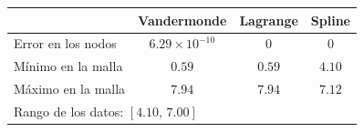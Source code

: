 \begin{tabular}{lccc}
  \toprule
  \rowcolor{Azul1!50}
   & Vandermonde & Lagrange & Spline \\
  \midrule
  Error en los nodos & $6.29\times10^{-10}$ & 0 & 0 \\
  Mínimo en la malla & $0.59$ & $0.59$ & $4.10$ \\
  Máximo en la malla & $7.94$ & $7.94$ & $7.12$ \\
  \midrule
  \multicolumn{4}{l}{Rango de los datos: $[4.10,\,7.00]$} \\
  \bottomrule
\end{tabular}
